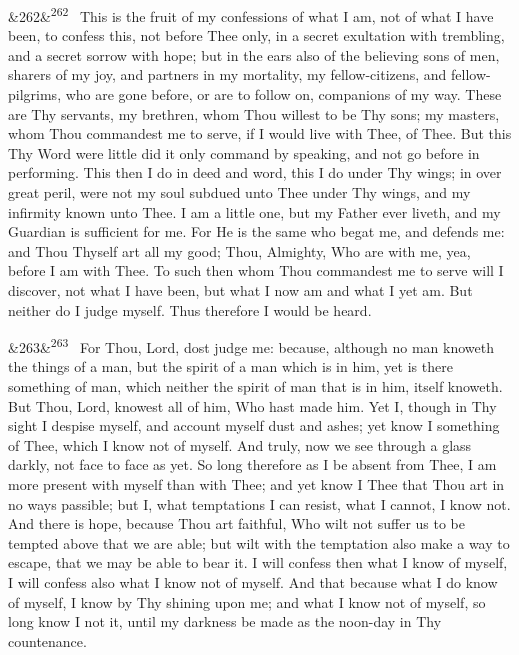 \documentclass[12pt]{article}
\newcommand{\para}[1][]{\par\noindent\ifx&#1&\else\textsuperscript{\footnotesize #1}~\fi}
\begin{document}
\para[262] This is the fruit of my confessions of what I am, not of what I have been, to confess this, not before Thee only, in a secret exultation with trembling, and a secret sorrow with hope; but in the ears also of the believing sons of men, sharers of my joy, and partners in my mortality, my fellow-citizens, and fellow-pilgrims, who are gone before, or are to follow on, companions of my way. These are Thy servants, my brethren, whom Thou willest to be Thy sons; my masters, whom Thou commandest me to serve, if I would live with Thee, of Thee. But this Thy Word were little did it only command by speaking, and not go before in performing. This then I do in deed and word, this I do under Thy wings; in over great peril, were not my soul subdued unto Thee under Thy wings, and my infirmity known unto Thee. I am a little one, but my Father ever liveth, and my Guardian is sufficient for me. For He is the same who begat me, and defends me: and Thou Thyself art all my good; Thou, Almighty, Who are with me, yea, before I am with Thee. To such then whom Thou commandest me to serve will I discover, not what I have been, but what I now am and what I yet am. But neither do I judge myself. Thus therefore I would be heard.

\para[263] For Thou, Lord, dost judge me: because, although no man knoweth the things of a man, but the spirit of a man which is in him, yet is there something of man, which neither the spirit of man that is in him, itself knoweth. But Thou, Lord, knowest all of him, Who hast made him. Yet I, though in Thy sight I despise myself, and account myself dust and ashes; yet know I something of Thee, which I know not of myself. And truly, now we see through a glass darkly, not face to face as yet. So long therefore as I be absent from Thee, I am more present with myself than with Thee; and yet know I Thee that Thou art in no ways passible; but I, what temptations I can resist, what I cannot, I know not. And there is hope, because Thou art faithful, Who wilt not suffer us to be tempted above that we are able; but wilt with the temptation also make a way to escape, that we may be able to bear it. I will confess then what I know of myself, I will confess also what I know not of myself. And that because what I do know of myself, I know by Thy shining upon me; and what I know not of myself, so long know I not it, until my darkness be made as the noon-day in Thy countenance.
\end{document}
